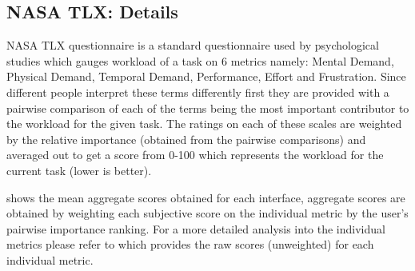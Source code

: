 



\subsection{NASA TLX: Details}
NASA TLX questionnaire \cite{hart1988development} is a standard questionnaire used by psychological studies which gauges workload of a task on 6 metrics namely: Mental Demand, Physical Demand, Temporal Demand, Performance, Effort and Frustration. Since different people interpret these terms differently first they are provided with a pairwise comparison of each of the terms being the most important contributor to the workload for the given task. The ratings on each of these scales are weighted by the relative importance (obtained from the pairwise comparisons) and averaged out to get a score from 0-100 which represents the workload for the current task (lower is better).

 shows the mean aggregate scores obtained for each interface, aggregate scores are obtained by weighting each subjective score on the individual metric by the user's pairwise importance ranking. For a more detailed analysis into the individual metrics please refer to  which provides the raw scores (unweighted) for each individual metric.




